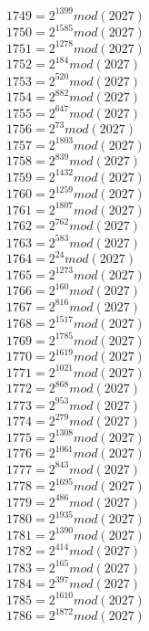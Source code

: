 \documentclass[12pt, letterpaper]{article}
\begin{document}
\begin{itemize}
\begin{multicols}{3}
$1749= 2^{1399} mod (2027)$\\
$1750= 2^{1585} mod (2027)$\\
$1751= 2^{1278} mod (2027)$\\
$1752= 2^{184} mod (2027)$\\
$1753= 2^{520} mod (2027)$\\
$1754= 2^{882} mod (2027)$\\
$1755= 2^{647} mod (2027)$\\
$1756= 2^{73} mod (2027)$\\
$1757= 2^{1803} mod (2027)$\\
$1758= 2^{839} mod (2027)$\\
$1759= 2^{1432} mod (2027)$\\
$1760= 2^{1259} mod (2027)$\\
$1761= 2^{1807} mod (2027)$\\
$1762= 2^{762} mod (2027)$\\
$1763= 2^{583} mod (2027)$\\
$1764= 2^{24} mod (2027)$\\
$1765= 2^{1273} mod (2027)$\\
$1766= 2^{160} mod (2027)$\\
$1767= 2^{816} mod (2027)$\\
$1768= 2^{1517} mod (2027)$\\
$1769= 2^{1785} mod (2027)$\\
$1770= 2^{1619} mod (2027)$\\
$1771= 2^{1021} mod (2027)$\\
$1772= 2^{868} mod (2027)$\\
$1773= 2^{953} mod (2027)$\\
$1774= 2^{279} mod (2027)$\\
$1775= 2^{1308} mod (2027)$\\
$1776= 2^{1061} mod (2027)$\\
$1777= 2^{843} mod (2027)$\\
$1778= 2^{1695} mod (2027)$\\
$1779= 2^{486} mod (2027)$\\
$1780= 2^{1935} mod (2027)$\\
$1781= 2^{1390} mod (2027)$\\
$1782= 2^{414} mod (2027)$\\
$1783= 2^{165} mod (2027)$\\
$1784= 2^{397} mod (2027)$\\
$1785= 2^{1610} mod (2027)$\\
$1786= 2^{1872} mod (2027)$\\

\end{multicols}
\end{itemize}
\end{document}
